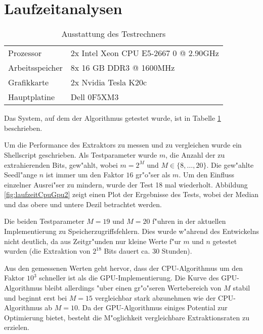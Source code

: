 \section{Laufzeitanalysen}
\begin{table}[t]
\centering
\begin{tabular}{ll}
\toprule
		Prozessor		& 2x Intel Xeon CPU E5-2667 0 @ 2.90GHz\\
		Arbeitsspeicher	& 8x 16 GB DDR3 @ 1600MHz\\
		Grafikkarte		& 2x Nvidia Tesla K20c\\
		Hauptplatine	& Dell 0F5XM3\\
\bottomrule
\end{tabular}
\caption{Ausstattung des Testrechners}
\label{table:systemausstattung}
\end{table}


Das System, auf dem der Algorithmus getestet wurde, ist in Tabelle \ref{table:systemausstattung} beschrieben.

Um die Performance des Extraktors zu messen und zu vergleichen wurde ein Shellscript geschrieben. Als Testparameter wurde $m$, die Anzahl der zu extrahierenden Bits, gew"ahlt, wobei $m = 2^M$ und $M \in \{8, \dots, 20\}$. Die gew"ahlte Seedl"ange $n$ ist immer um den Faktor $16$ gr"o"ser als $m$. Um den Einfluss einzelner Ausrei"ser zu mindern, wurde der Test 18 mal wiederholt. Abbildung \ref{fig:laufzeitCpuGpu2} zeigt einen Plot der Ergebnisse des Tests, wobei der Median und das obere und untere Dezil betrachtet werden.

Die beiden Testparameter $M=19$ und $M=20$ f"uhren in der aktuellen Implementierung zu Speicherzugriffsfehlern. Dies wurde w"ahrend des Entwickelns nicht deutlich, da aus Zeitgr"unden nur kleine Werte f"ur $m$ und $n$ getestet wurden (die Extraktion von $2^{18}$ Bits dauert ca. 30 Stunden).

Aus den gemessenen Werten geht hervor, dass der CPU-Algorithmus um den Faktor $10^3$ schneller ist als die GPU-Implementierung. Die Kurve des GPU-Algorithmus bleibt allerdings "uber einen gr"o"seren Wertebereich von $M$ stabil und beginnt erst bei $M=15$ vergleichbar stark abzunehmen wie der CPU-Algorithmus ab $M=10$. Da der GPU-Algorithmus einiges Potential zur Optimierung bietet, besteht die M"oglichkeit vergleichbare Extraktionsraten zu erzielen.

